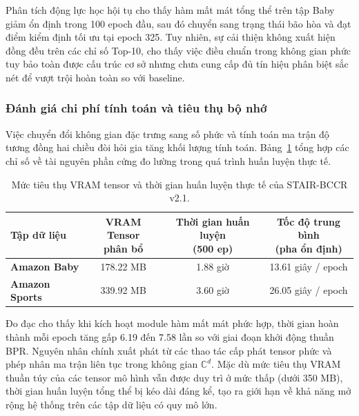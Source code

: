 Phân tích động lực học hội tụ cho thấy hàm mất mát tổng thể trên tập Baby giảm ổn định trong 100 epoch đầu, sau đó chuyển sang trạng thái bão hòa và đạt điểm kiểm định tối ưu tại epoch 325. Tuy nhiên, sự cải thiện không xuất hiện đồng đều trên các chỉ số Top-10, cho thấy việc điều chuẩn trong không gian phức tuy bảo toàn được cấu trúc cơ sở nhưng chưa cung cấp đủ tín hiệu phân biệt sắc nét để vượt trội hoàn toàn so với baseline.

\subsubsection{Đánh giá chi phí tính toán và tiêu thụ bộ nhớ}

Việc chuyển đổi không gian đặc trưng sang số phức và tính toán ma trận độ tương đồng hai chiều đòi hỏi gia tăng khối lượng tính toán. Bảng~\ref{tab:stair_v2_hardware} tổng hợp các chỉ số về tài nguyên phần cứng đo lường trong quá trình huấn luyện thực tế.

\begin{table}[H]
\centering
\small
\setlength{\tabcolsep}{6pt}
\renewcommand{\arraystretch}{1.2}
\caption{Mức tiêu thụ VRAM tensor và thời gian huấn luyện thực tế của STAIR-BCCR v2.1.}
\label{tab:stair_v2_hardware}
\begin{tabular}{lccc}
\toprule
\rowcolor{gray!15}
\textbf{Tập dữ liệu} & \makecell{\textbf{VRAM Tensor}\\\textbf{phân bổ}} & \makecell{\textbf{Thời gian huấn luyện}\\\textbf{(500 ep)}} & \makecell{\textbf{Tốc độ trung bình}\\\textbf{(pha ổn định)}} \\
\midrule
\textbf{Amazon Baby}   & 178.22 MB & 1.88 giờ & 13.61 giây / epoch \\
\textbf{Amazon Sports} & 339.92 MB & 3.60 giờ & 26.05 giây / epoch \\
\bottomrule
\end{tabular}
\end{table}

Đo đạc cho thấy khi kích hoạt module hàm mất mát phức hợp, thời gian hoàn thành mỗi epoch tăng gấp 6.19 đến 7.58 lần so với giai đoạn khởi động thuần BPR. Nguyên nhân chính xuất phát từ các thao tác cấp phát tensor phức và phép nhân ma trận liên tục trong không gian $\mathbb{C}^d$. Mặc dù mức tiêu thụ VRAM thuần túy của các tensor mô hình vẫn được duy trì ở mức thấp (dưới 350 MB), thời gian huấn luyện tổng thể bị kéo dài đáng kể, tạo ra giới hạn về khả năng mở rộng hệ thống trên các tập dữ liệu có quy mô lớn.

